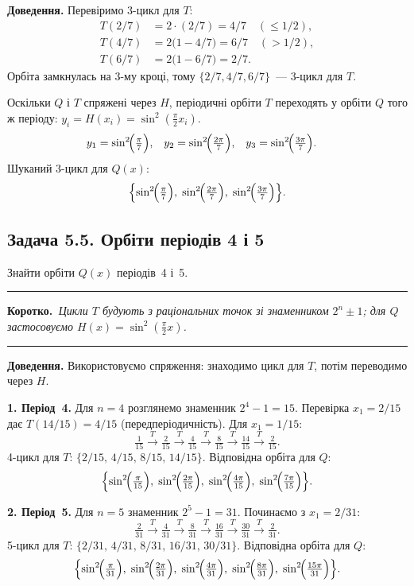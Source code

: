 \documentclass[12pt,a4paper]{article}
\newenvironment{korotko}
  {\par\medskip\noindent\begingroup\color{accent!75!black}\rule{\linewidth}{0.4pt}\par
   \noindent\textbf{Коротко.}\itshape\,}
  {\par\noindent\rule{\linewidth}{0.4pt}\endgroup\medskip}
\begin{document}
\noindent\textbf{Доведення.}
Перевіримо 3-цикл для $T$:
\begin{align*}
  T(2/7) &= 2\cdot(2/7)=4/7 \quad (\le 1/2),\\
  T(4/7) &= 2\bigl(1-4/7\bigr)=6/7 \quad (> 1/2),\\
  T(6/7) &= 2\bigl(1-6/7\bigr)=2/7.
\end{align*}
Орбіта замкнулась на 3-му кроці, тому $\{2/7,4/7,6/7\}$~--- 3-цикл для $T$.

Оскільки $Q$ і $T$ спряжені через $H$, періодичні орбіти $T$ переходять у
орбіти $Q$ того ж періоду: $y_i=H(x_i)=\sin^2(\tfrac{\pi}{2}x_i)$.
\begin{align*}
  y_1 &= \sin^2\!\Bigl(\tfrac{\pi}{7}\Bigr), &
  y_2 &= \sin^2\!\Bigl(\tfrac{2\pi}{7}\Bigr), &
  y_3 &= \sin^2\!\Bigl(\tfrac{3\pi}{7}\Bigr).
\end{align*}
Шуканий 3-цикл для $Q(x)$:
\[
  \Bigl\{\sin^2\!\Bigl(\tfrac{\pi}{7}\Bigr),\;
        \sin^2\!\Bigl(\tfrac{2\pi}{7}\Bigr),\;
        \sin^2\!\Bigl(\tfrac{3\pi}{7}\Bigr)\Bigr\}.
\]

\subsection{Задача 5.5. Орбіти періодів 4 і 5}
Знайти орбіти $Q(x)$ періодів~4 і~5.

\begin{korotko}
Цикли $T$ будують з раціональних точок зі знаменником $2^n\pm1$; для $Q$
застосовуємо $H(x)=\sin^2(\tfrac{\pi}{2}x)$.
\end{korotko}

\noindent\textbf{Доведення.}
Використовуємо спряження: знаходимо цикл для $T$, потім переводимо через $H$.

\textbf{1. Період~4.}
Для $n=4$ розглянемо знаменник $2^4-1=15$. Перевірка $x_1=2/15$ дає
$T(14/15)=4/15$ (передперіодичність). Для $x_1=1/15$:
\[
  \tfrac{1}{15}\xrightarrow{T}\tfrac{2}{15}\xrightarrow{T}\tfrac{4}{15}
  \xrightarrow{T}\tfrac{8}{15}\xrightarrow{T}\tfrac{14}{15}\xrightarrow{T}\tfrac{2}{15}.
\]
4-цикл для $T$: $\{2/15,\,4/15,\,8/15,\,14/15\}$.
Відповідна орбіта для $Q$:
\[
  \Bigl\{\sin^2\!\Bigl(\tfrac{\pi}{15}\Bigr),\;
        \sin^2\!\Bigl(\tfrac{2\pi}{15}\Bigr),\;
        \sin^2\!\Bigl(\tfrac{4\pi}{15}\Bigr),\;
        \sin^2\!\Bigl(\tfrac{7\pi}{15}\Bigr)\Bigr\}.
\]

\textbf{2. Період~5.}
Для $n=5$ знаменник $2^5-1=31$. Починаємо з $x_1=2/31$:
\[
  \tfrac{2}{31}\xrightarrow{T}\tfrac{4}{31}\xrightarrow{T}\tfrac{8}{31}
  \xrightarrow{T}\tfrac{16}{31}\xrightarrow{T}\tfrac{30}{31}\xrightarrow{T}\tfrac{2}{31}.
\]
5-цикл для $T$: $\{2/31,\,4/31,\,8/31,\,16/31,\,30/31\}$.
Відповідна орбіта для $Q$:
\[
  \Bigl\{\sin^2\!\Bigl(\tfrac{\pi}{31}\Bigr),\;
        \sin^2\!\Bigl(\tfrac{2\pi}{31}\Bigr),\;
        \sin^2\!\Bigl(\tfrac{4\pi}{31}\Bigr),\;
        \sin^2\!\Bigl(\tfrac{8\pi}{31}\Bigr),\;
        \sin^2\!\Bigl(\tfrac{15\pi}{31}\Bigr)\Bigr\}.
\]
\end{document}
